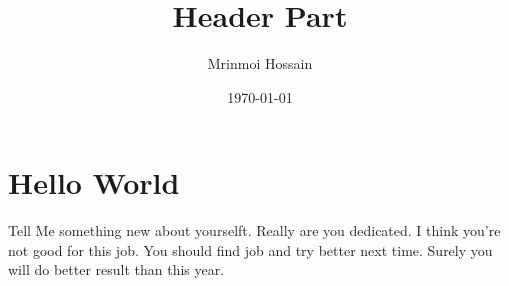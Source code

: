\documentclass[11pt]{article}
\begin{document}
\title{Header Part}
\author{Mrinmoi Hossain}
\date{\today}
\maketitle

\section{Hello World}
Tell Me something new about yourselft. Really are you dedicated. I think you're not good for this job. You should find job and try better next time. Surely you will do better result than this year.
\end{document}
